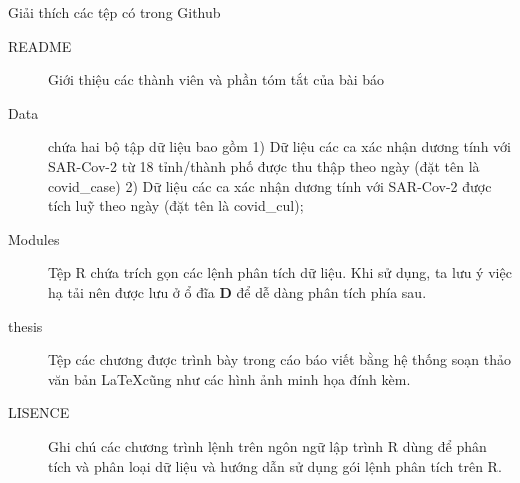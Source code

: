 \documentclass[../thesis.tex]{subfiles}
\begin{document}
Giải thích các tệp có trong Github
\begin{description}
	\item[README] Giới thiệu các thành viên và phần tóm tắt của bài báo
	\item[Data] chứa hai bộ tập dữ liệu bao gồm 1) Dữ liệu các ca xác nhận dương tính với SAR-Cov-2 từ 18 tỉnh/thành phố được thu thập theo ngày (đặt tên là \textsf{covid\_case}) 2) Dữ liệu các ca xác nhận dương tính với SAR-Cov-2 được tích luỹ theo ngày (đặt tên là \textsf{covid\_cul});
	\item[Modules] Tệp R chứa trích gọn các lệnh phân tích dữ liệu. Khi sử dụng, ta lưu ý việc hạ tải nên được lưu ở ổ đĩa \textbf{D} để dễ dàng phân tích phía sau. 
	\item[thesis] Tệp các chương được trình bày trong cáo báo viết bằng hệ thống soạn thảo văn bản \LaTeX cũng như các hình ảnh minh họa đính kèm.
	\item[LISENCE] Ghi chú các chương trình lệnh trên ngôn ngữ lập trình R dùng để phân tích và phân loại dữ liệu và hướng dẫn sử dụng gói lệnh phân tích trên R.
\end{description}
\end{document}
